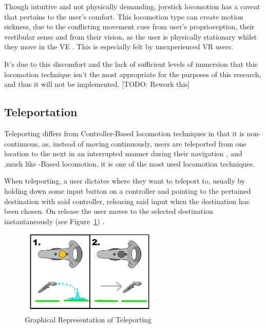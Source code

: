 Though intuitive and not physically demanding, joystick locomotion has a caveat that pertains to the user's comfort. This locomotion type can create
motion sickness, due to the conflicting movement cues from user's proprioception, their vestibular sense and from their vision, as the user 
is physically stationary whilst they move in the \gls{VE} \cite{Langbehn2018}. This is especially felt by unexperienced \gls{VR} users. \cite{Nasiri2023}

It's due to this discomfort and the lack of sufficient levels of immersion that this locomotion technique isn't the most appropriate for 
the purposes of this research, and thus it will not be implemented. [TODO: Rework this]

\subsection{Teleportation}
\label{sec:teleportation}

Teleporting differs from Controller-Based locomotion techniques in that it is non-continuous, as, 
instead of moving continuously, users are teleported from one location to the next in an interrupted manner during their navigation \cite{Boletsis2017}, 
and ,much like -Based locomotion, it is one of the most used locomotion techniques\cite{Boletsis2022}.

When teleporting, a user dictates where they want to teleport to, usually by holding down some input button on a controller and pointing to
the pertained destination with said controller, releasing said input when the destination has been chosen. On release the user 
moves to the selected destination instantaneously (see Figure~\ref{fig:teleporting}) \cite{Coomer2018, Nasiri2023}.

\begin{figure}[b]
    \centering
    \includegraphics[width=0.6\textwidth]{NOVAthesisFiles/Images/papers/teleporting.png}
    \caption{Graphical Representation of Teleporting \cite{Coomer2018}}
    \label{fig:teleporting}
\end{figure}

